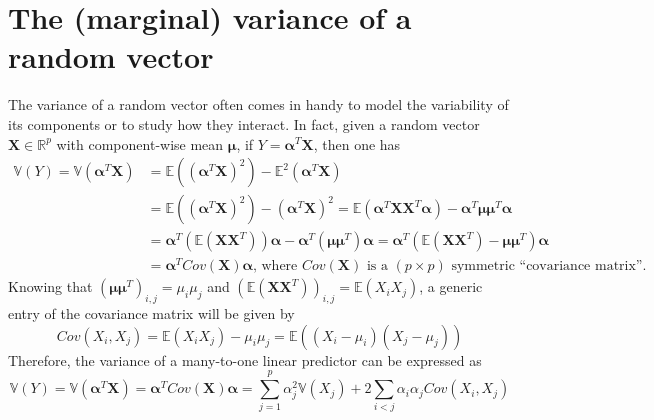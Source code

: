\documentclass{report}
\begin{document}
\section{The (marginal) variance of a random vector}
The variance of a random vector often comes in handy to model the variability of its components or to study how they interact. \newline
In fact, given a random vector $\displaystyle \mathbf{X} \in \mathbb{R}^p$ with component-wise mean $\displaystyle \mathbf{\mu}$, if $\displaystyle Y = \mathbf{\alpha}^T\mathbf{X}$, then one has
\begin{align*}
    \mathbb{V}(Y) = \mathbb{V}(\mathbf{\alpha}^T\mathbf{X})
        &= \mathbb{E}((\mathbf{\alpha}^T\mathbf{X})^2) - \mathbb{E}^2(\mathbf{\alpha}^T\mathbf{X}) \\
        &= \mathbb{E}((\mathbf{\alpha}^T\mathbf{X})^2) - (\mathbf{\alpha}^T\mathbf{X})^2 = \mathbb{E}(\mathbf{\alpha}^T\mathbf{XX}^T\mathbf{\alpha}) - \mathbf{\alpha}^T\mathbf{\mu\mu}^T\mathbf{\alpha} \\
        &= \mathbf{\alpha}^T(\mathbb{E}(\mathbf{XX}^T))\mathbf{\alpha} - \mathbf{\alpha}^T(\mathbf{\mu\mu}^T)\mathbf{\alpha} = \mathbf{\alpha}^T(\mathbb{E}(\mathbf{XX}^T) - \mathbf{\mu\mu}^T)\mathbf{\alpha} \\
        &= \mathbf{\alpha}^TCov(\mathbf{X})\mathbf{\alpha} \text{, where $Cov(\mathbf{X})$ is a $(p \times p)$ symmetric ``covariance matrix''.}
\end{align*}
Knowing that $\displaystyle (\mathbf{\mu\mu}^T)_{i, j} = \mu_i\mu_j$ and $\displaystyle (\mathbb{E}(\mathbf{XX}^T))_{i, j} = \mathbb{E}(X_iX_j)$, a generic entry of the covariance matrix will be given by
\[Cov(X_i, X_j) = \mathbb{E}(X_iX_j) - \mu_i\mu_j = \mathbb{E}((X_i - \mu_i)(X_j - \mu_j))\]
Therefore, the variance of a many-to-one linear predictor can be expressed as
\[\mathbb{V}(Y) = \mathbb{V}(\mathbf{\alpha}^T\mathbf{X}) = \mathbf{\alpha}^TCov(\mathbf{X})\mathbf{\alpha} = \sum_{j = 1}^p \alpha_j^2\mathbb{V}(X_j) + 2\sum_{i < j} \alpha_i\alpha_jCov(X_i, X_j)\]
\end{document}
